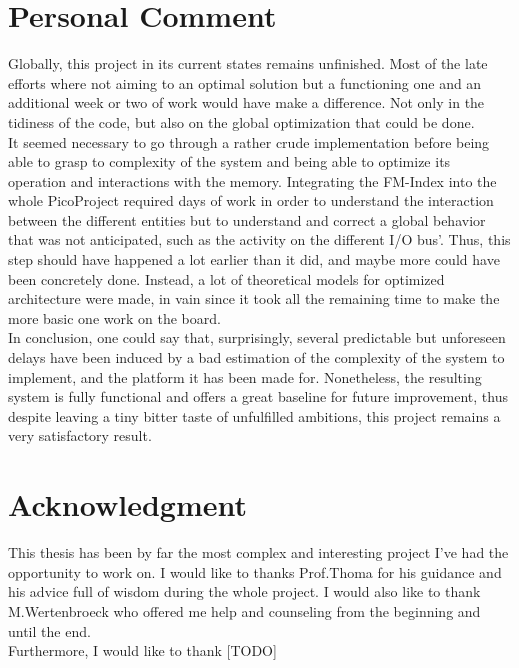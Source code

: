 \section{Personal Comment}

Globally, this project in its current states remains unfinished. Most of the late efforts where not aiming to an optimal solution but a functioning one and an additional week or two of work would have make a difference. Not only in the tidiness of the code, but also on the global optimization that could be done. \\

It seemed necessary to go through a rather crude implementation before being able to grasp to complexity of the system and being able to optimize its operation and interactions with the memory. Integrating the FM-Index into the whole PicoProject required days of work in order to understand the interaction between the different entities but to understand and correct a global behavior that was not anticipated, such as the activity on the different I/O bus'. Thus, this step should have happened a lot earlier than it did, and maybe more could have been concretely done. Instead, a lot of theoretical models for optimized architecture were made, in vain since it took all the remaining time to make the more basic one work on the board. \\

In conclusion, one could say that, surprisingly, several predictable but unforeseen delays have been induced by a bad estimation of the complexity of the system to implement, and the platform it has been made for. Nonetheless, the resulting system is fully functional and offers a great baseline for future improvement, thus despite leaving a tiny bitter taste of unfulfilled ambitions, this project remains a very satisfactory result.

\section{Acknowledgment}

This thesis has been by far the most complex and interesting project I've had the opportunity to work on. I would like to thanks Prof.Thoma for his guidance and his advice full of wisdom during the whole project. I would also like to thank M.Wertenbroeck who offered me help and counseling from the beginning and until the end. \\

Furthermore, I would like to thank [TODO]\\

